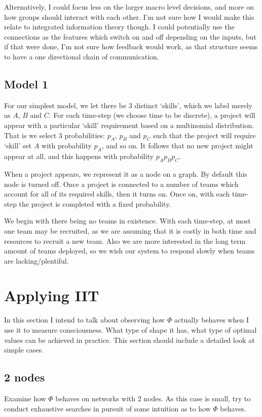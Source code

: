 Alternatively, I could focus less on the larger macro level decisions, and more on how groups should interact with each other. I'm not sure how I would make this relate to integrated information theory though. I could potentially use the connections as the features which switch on and off depending on the inputs, but if that were done, I'm not sure how feedback would work, as that structure seems to have a one directional chain of communication.

\subsection{Model 1}
For our simplest model, we let there be 3 distinct `skills', which we label merely as $A$, $B$ and $C$. For each time-step (we choose time to be discrete), a project will appear with a particular `skill' requirement based on a multinomial distribution. That is we select 3 probabilities: $p_A$, $p_B$ and $p_C$ such that the project will require `skill' set $A$ with probability $p_A$, and so on. It follows that no new project might appear at all, and this happens with probability $p_A p_B p_C$.

When a project appears, we represent it as a node on a graph. By default this node is turned off. Once a project is connected to a number of teams which account for all of its required skills, then it turns on. Once on, with each time-step the project is completed with a fixed probability. 

We begin with there being no teams in existence. With each time-step, at most one team may be recruited, as we are assuming that it is costly in both time and resources to recruit a new team. Also we are more interested in the long term amount of teams deployed, so we wish our system to respond slowly when teams are lacking/plentiful.
\fi

\section{Applying IIT}
In this section I intend to talk about observing how $\Phi$ actually behaves when I use it to measure consciousness. What type of shape it has, what type of optimal values can be achieved in practice. This section should include a detailed look at simple cases.

\subsection{2 nodes}
Examine how $\Phi$ behaves on networks with 2 nodes. As this case is small, try to conduct exhaustive searches in pursuit of some intuition as to how $\Phi$ behaves.
